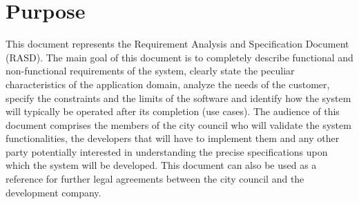 \section{Purpose}
This document represents the Requirement Analysis and Specification Document (RASD). The main goal of this document is to completely describe functional and non-functional requirements of the system, clearly state the peculiar characteristics of the application domain, analyze the needs of the customer, specify the constraints and the limits of the software and identify how the system will typically be operated after its completion (use cases). The audience of this document comprises the members of the city council who will validate the system functionalities, the developers that will have to implement them and any other party potentially interested in understanding the precise specifications upon which the system will be developed. This document can also be used as a reference for further legal agreements between the city council and the development company.

